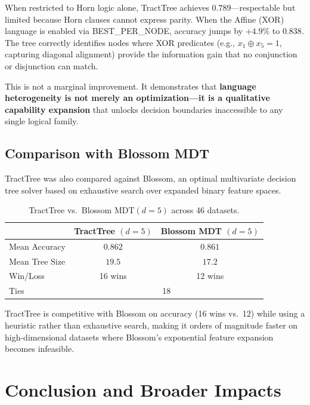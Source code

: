 \documentclass[11pt,a4paper]{article}
\begin{document}
When restricted to Horn logic alone, TractTree achieves $0.789$---respectable but limited because Horn clauses cannot express parity. When the Affine (XOR) language is enabled via BEST\_PER\_NODE, accuracy jumps by $+4.9\%$ to $0.838$. The tree correctly identifies nodes where XOR predicates (e.g., $x_1 \oplus x_5 = 1$, capturing diagonal alignment) provide the information gain that no conjunction or disjunction can match.

This is not a marginal improvement. It demonstrates that \textbf{language heterogeneity is not merely an optimization---it is a qualitative capability expansion} that unlocks decision boundaries inaccessible to any single logical family.

\subsection{Comparison with Blossom MDT}

TractTree was also compared against Blossom, an optimal multivariate decision tree solver based on exhaustive search over expanded binary feature spaces.

\begin{table}[H]
\centering
\caption{TractTree vs.\ Blossom MDT$(d\!=\!5)$ across 46 datasets.}
\label{tab:blossom}
\begin{tabular}{@{}lcc@{}}
\toprule
 & \textbf{TractTree $(d\!=\!5)$} & \textbf{Blossom MDT $(d\!=\!5)$} \\
\midrule
Mean Accuracy & $0.862$ & $0.861$ \\
Mean Tree Size & $19.5$ & $17.2$ \\
Win/Loss & 16 wins & 12 wins \\
Ties & \multicolumn{2}{c}{18} \\
\bottomrule
\end{tabular}
\end{table}

TractTree is competitive with Blossom on accuracy (16 wins vs.\ 12) while using a heuristic rather than exhaustive search, making it orders of magnitude faster on high-dimensional datasets where Blossom's exponential feature expansion becomes infeasible.


\section{Conclusion and Broader Impacts}
\end{document}
